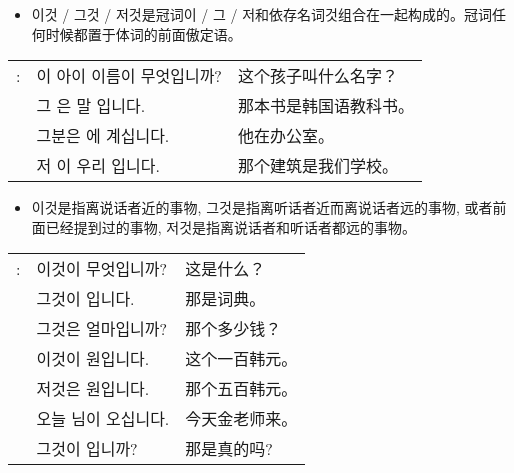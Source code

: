 \begin{grammar}
	\begin{grammarsect}[\kr 이것 / 그것 / 저것]
		\begin{itemize}
			\item {\kr 이것 / 그것 / 저것}是冠词{\kr 이 / 그 / 저}和依存名词{\kr 것}组合在一起构成的。冠词任何时候都置于体词的前面傲定语。
		\end{itemize}
		\begin{tabular}{lll}
			\kr \ruby{例}{예}: & \kr 이 아이 이름이 무엇입니까?                                   & 这个孩子叫什么名字？  \\
			                 & \kr 그 \ruby{冊}{책}은 \ruby{韓國}{한국}말 \ruby{敎科書}{교과서}입니다. & 那本书是韩国语教科书。 \\
			                 & \kr 그분은 \ruby{事務室}{사무실}에 계십니다.                        & 他在办公室。      \\
			                 & \kr 저 \ruby{建物}{건물}이 우리 \ruby{學校}{학교}입니다.             & 那个建筑是我们学校。  \\
		\end{tabular}
		\begin{itemize}
			\item {\kr 이것}是指离说话者近的事物, {\kr 그것}是指离听话者近而离说话者远的事物, 或者前面已经提到过的事物, 저것是指离说话者和听话者都远的事物。
		\end{itemize}
		\begin{tabular}{lll}
			\kr \ruby{例}{예}: & \kr 이것이 무엇입니까?                           & 这是什么？   \\
			                 & \kr 그것이 \ruby{辭典}{사전}입니다.                & 那是词典。   \\
			                 & \kr 그것은 얼마입니까?                           & 那个多少钱？  \\
			                 & \kr 이것이 \ruby{百}{백} 원입니다.                & 这个一百韩元。 \\
			                 & \kr 저것은 \ruby{五百}{오백} 원입니다.              & 那个五百韩元。 \\
			                 & \kr 오늘 \ruby{金}{김} \ruby{先生}{선생}님이 오십니다. & 今天金老师来。 \\
			                 & \kr 그것이 \ruby{事實}{사실}입니까?                & 那是真的吗?
		\end{tabular}\\
	\end{grammarsect}
\end{grammar}
